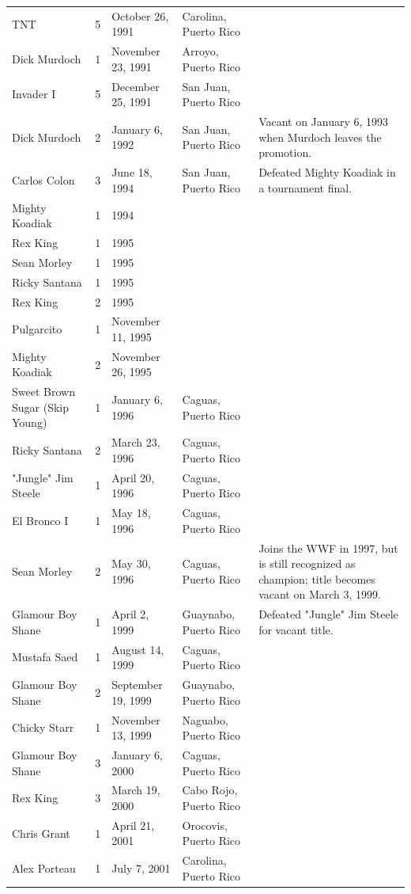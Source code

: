 \documentclass{article}
\begin{document}
\begin{tabular}{lllll}
TNT & 5 & October 26, 1991 & Carolina, Puerto Rico &  \\
Dick Murdoch & 1 & November 23, 1991 & Arroyo, Puerto Rico &  \\
Invader I & 5 & December 25, 1991 & San Juan, Puerto Rico &  \\
Dick Murdoch & 2 & January 6, 1992 & San Juan, Puerto Rico & Vacant on January 6, 1993 when Murdoch leaves the promotion. \\
Carlos Colon & 3 & June 18, 1994 & San Juan, Puerto Rico & Defeated Mighty Koadiak in a tournament final. \\
Mighty Koadiak & 1 & 1994 &  &  \\
Rex King & 1 & 1995 &  &  \\
Sean Morley & 1 & 1995 &  &  \\
Ricky Santana & 1 & 1995 &  &  \\
Rex King & 2 & 1995 &  &  \\
Pulgarcito & 1 & November 11, 1995 &  &  \\
Mighty Koadiak & 2 & November 26, 1995 &  &  \\
Sweet Brown Sugar (Skip Young) & 1 & January 6, 1996 & Caguas, Puerto Rico &  \\
Ricky Santana & 2 & March 23, 1996 & Caguas, Puerto Rico &  \\
"Jungle" Jim Steele & 1 & April 20, 1996 & Caguas, Puerto Rico &  \\
El Bronco I & 1 & May 18, 1996 & Caguas, Puerto Rico &  \\
Sean Morley & 2 & May 30, 1996 & Caguas, Puerto Rico & Joins the WWF in 1997, but is still recognized as champion; title becomes vacant on March 3, 1999. \\
Glamour Boy Shane & 1 & April 2, 1999 & Guaynabo, Puerto Rico & Defeated "Jungle" Jim Steele for vacant title. \\
Mustafa Saed & 1 & August 14, 1999 & Caguas, Puerto Rico &  \\
Glamour Boy Shane & 2 & September 19, 1999 & Guaynabo, Puerto Rico &  \\
Chicky Starr & 1 & November 13, 1999 & Naguabo, Puerto Rico &  \\
Glamour Boy Shane & 3 & January 6, 2000 & Caguas, Puerto Rico &  \\
Rex King & 3 & March 19, 2000 & Cabo Rojo, Puerto Rico &  \\
Chris Grant & 1 & April 21, 2001 & Orocovis, Puerto Rico &  \\
Alex Porteau & 1 & July 7, 2001 & Carolina, Puerto Rico &  \\

\end{tabular}
\end{document}
